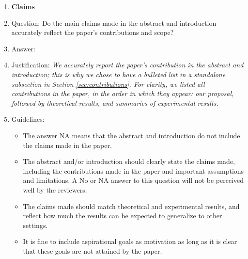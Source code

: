 \documentclass{article}
\theoremstyle{plain}
\begin{document}

\begin{enumerate}

\item {\bf Claims}
    \item[] Question: Do the main claims made in the abstract and introduction accurately reflect the paper's contributions and scope?
    \item[] Answer: \answerYes %
    \item[] Justification: \textit{We accurately report the paper's contribution in the abstract and introduction; this is why we chose to have a bulleted list in a standalone subsection in Section \ref{sec:contributions}. For clarity, we listed all contributions in the paper, in the order in which they appear: our proposal, followed by theoretical results, and summaries of experimental results.}
    \item[] Guidelines:
    \begin{itemize}
        \item The answer NA means that the abstract and introduction do not include the claims made in the paper.
        \item The abstract and/or introduction should clearly state the claims made, including the contributions made in the paper and important assumptions and limitations. A No or NA answer to this question will not be perceived well by the reviewers. 
        \item The claims made should match theoretical and experimental results, and reflect how much the results can be expected to generalize to other settings. 
        \item It is fine to include aspirational goals as motivation as long as it is clear that these goals are not attained by the paper. 
    \end{itemize}


\end{enumerate}
\end{document}
